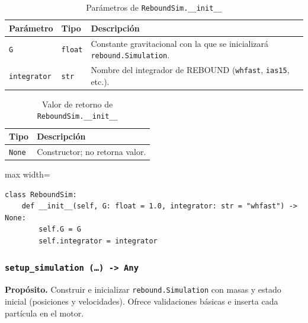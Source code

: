 \begin{table}[H]
  \centering
  \caption{Parámetros de \texttt{ReboundSim.\_\_init\_\_}}
  \small
  \begin{tabularx}{\textwidth}{@{}p{}p{}X@{}}
    \toprule
    \textbf{Parámetro} & \textbf{Tipo} & \textbf{Descripción} \\
    \midrule
    \texttt{G} & \texttt{float} & Constante gravitacional con la que se inicializará \texttt{rebound.Simulation}. \\
    \texttt{integrator} & \texttt{str} & Nombre del integrador de REBOUND (\texttt{whfast}, \texttt{ias15}, etc.). \\
    \bottomrule
  \end{tabularx}
\end{table}
\vspace{0.2cm}
\begin{table}[H]
  \centering
  \caption{Valor de retorno de \texttt{ReboundSim.\_\_init\_\_}}
  \small
  \begin{tabularx}{\textwidth}{@{}p{}X@{}}
    \toprule
    \textbf{Tipo} & \textbf{Descripción} \\
    \midrule
    \texttt{None} & Constructor; no retorna valor. \\
    \bottomrule
  \end{tabularx}
\end{table}
\vspace{0.2cm}
\begin{listing}[H]
\caption{Bloque de código de \texttt{ReboundSim.\_\_init\_\_}}
\begin{adjustbox}{max width=\textwidth}
\begin{minipage}{\textwidth}
\begin{verbatim}
class ReboundSim:
    def __init__(self, G: float = 1.0, integrator: str = "whfast") -> None:
        self.G = G
        self.integrator = integrator
\end{verbatim}
\end{minipage}
\end{adjustbox}
\end{listing}
\newpage

\subsubsection*{\texttt{setup\_simulation~(\dots) -> Any}}
\par\smallskip
\noindent\textbf{Propósito.} Construir e inicializar \texttt{rebound.Simulation} con masas y estado inicial (posiciones y velocidades). Ofrece validaciones básicas e inserta cada partícula en el motor.\\
\vspace{0.2cm}

